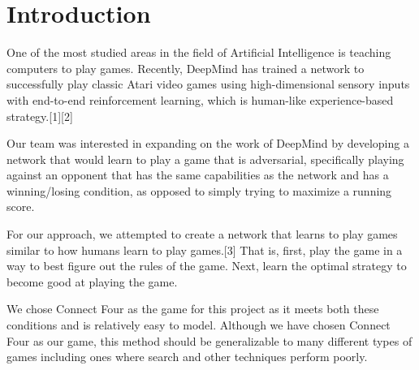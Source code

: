 \section{Introduction}
One of the most studied areas in the field of Artificial Intelligence is teaching computers to play games. Recently, DeepMind has trained a network to successfully play classic Atari video games using high-dimensional sensory inputs with end-to-end reinforcement learning, which is human-like experience-based strategy.[1][2]

Our team was interested in expanding on the work of DeepMind by developing a network that would learn to play a game that is adversarial, specifically playing against an opponent that has the same capabilities as the network and has a winning/losing condition, as opposed to simply trying to maximize a running score.

For our approach, we attempted to create a network that learns to play games similar to how humans learn to play games.[3] That is, first, play the game in a way to best figure out the rules of the game. Next, learn the optimal strategy to become good at playing the game. 

We chose Connect Four as the game for this project as it meets both these conditions and is relatively easy to model. Although we have chosen Connect Four as our game, this method should be generalizable to many different types of games including ones where search and other techniques perform poorly.
